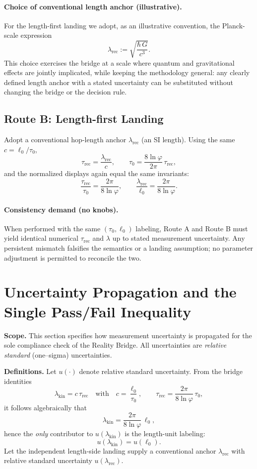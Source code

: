 \documentclass[11pt]{article}
\theoremstyle{plain}
\theoremstyle{definition}
\theoremstyle{remark}
\begin{document}
\paragraph{Choice of conventional length anchor (illustrative).}
For the length-first landing we adopt, as an illustrative convention, the Planck-scale expression
\[
\lambda_{\mathrm{rec}}:=\sqrt{\frac{\hbar\,G}{c^{3}}}.
\]
This choice exercises the bridge at a scale where quantum and gravitational effects are jointly implicated, while keeping the methodology general: any clearly defined length anchor with a stated uncertainty can be substituted without changing the bridge or the decision rule.

\subsection*{Route B: Length-first Landing}
Adopt a conventional hop-length anchor \(\lambda_{\mathrm{rec}}\) (an SI length). Using the same \(c=\ell_{0}/\tau_{0}\),
\[
\tau_{\mathrm{rec}}=\frac{\lambda_{\mathrm{rec}}}{c},
\qquad
\tau_{0}=\frac{8\ln\varphi}{2\pi}\,\tau_{\mathrm{rec}},
\]
and the normalized displays again equal the same invariants:
\[
\frac{\tau_{\mathrm{rec}}}{\tau_{0}}=\frac{2\pi}{8\ln\varphi},
\qquad
\frac{\lambda_{\mathrm{rec}}}{\ell_{0}}=\frac{2\pi}{8\ln\varphi}.
\]

\paragraph{Consistency demand (no knobs).}
When performed with the same \((\tau_{0},\ell_{0})\) labeling, Route A and Route B must yield identical numerical \(\tau_{\mathrm{rec}}\) and \(\lambda\) up to stated measurement uncertainty. Any persistent mismatch falsifies the semantics or a landing assumption; no parameter adjustment is permitted to reconcile the two.

\section{Uncertainty Propagation and the Single Pass/Fail Inequality}

\noindent\textbf{Scope.} This section specifies how measurement uncertainty is propagated for the sole compliance check of the Reality Bridge. All uncertainties are \emph{relative standard} (one–sigma) uncertainties.

\medskip
\noindent\textbf{Definitions.} Let \(u(\cdot)\) denote relative standard uncertainty. From the bridge identities
\[
\lambda_{\mathrm{kin}}=c\,\tau_{\mathrm{rec}}
\quad\text{with}\quad
c=\frac{\ell_{0}}{\tau_{0}},
\qquad
\tau_{\mathrm{rec}}=\frac{2\pi}{8\ln\varphi}\,\tau_{0},
\]
it follows algebraically that
\[
\lambda_{\mathrm{kin}}
=\frac{2\pi}{8\ln\varphi}\,\ell_{0},
\]
hence the \emph{only} contributor to \(u(\lambda_{\mathrm{kin}})\) is the length-unit labeling:
\[
u(\lambda_{\mathrm{kin}})=u(\ell_{0}).
\]
Let the independent length-side landing supply a conventional anchor \(\lambda_{\mathrm{rec}}\) with relative standard uncertainty \(u(\lambda_{\mathrm{rec}})\).
\end{document}
